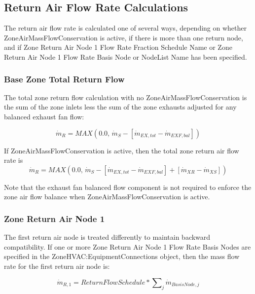 \subsection{Return Air Flow Rate Calculations}\label{return-air-flow-rate-calculations}

The return air flow rate is calculated one of several ways, depending on whether ZoneAirMassFlowConservation is active, if there is more than one return node, and if Zone Return Air Node 1 Flow Rate Fraction Schedule Name or Zone Return Air Node 1 Flow Rate Basis Node or NodeList Name has been specified.


\subsubsection{Base Zone Total Return Flow}\label{base-zone-total-return-flow}

The total zone return flow calculation with no ZoneAirMassFlowConservation is the sum of the zone inlets less the sum of the zone exhausts adjusted for any balanced exhaust fan flow:

\begin{equation}
{\dot m_{R}} = MAX\left( {0.0,\,{{\dot m}_S} - [{{\dot m}_{EX,tot}} - {\dot m_{EXF,bal}}]} \right)
\end{equation}

If ZoneAirMassFlowConservation is active, then the total zone return air flow rate is
\begin{equation}
{\dot m_{R}} = MAX\left( {0.0,\,{{\dot m}_S} - [{{\dot m}_{EX,tot}} - {\dot m_{EXF,bal}}] + [{{\dot m}_{XR}} - {{\dot m}_{XS}}]} \right)
\end{equation}

Note that the exhaust fan balanced flow component is not required to enforce the zone air flow balance when ZoneAirMassFlowConservation is active.

\subsubsection{Zone Return Air Node 1}\label{zone-return-air-node1}

The first return air node is treated differently to maintain backward compatibility. If one or more Zone Return Air Node 1 Flow Rate Basis Nodes are specified in the ZoneHVAC:EquipmentConnections object, then the mass flow rate for the first return air node is:

\begin{equation}
{\dot m_{R,1}} = ReturnFlowSchedule*\sum\nolimits_j {{{\dot m}_{BasisNode,j}}}
\end{equation}

